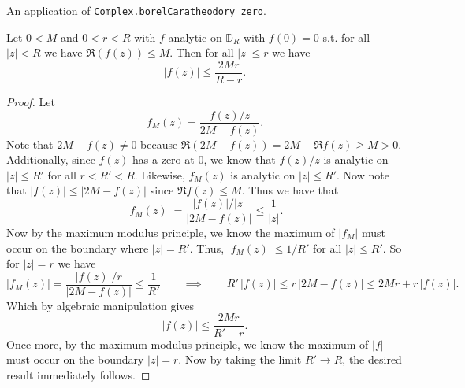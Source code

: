 \begin{theorem}[borelCaratheodory']
\label{borelCaratheodory'}
\leanok
An application of \texttt{Complex.borelCaratheodory\_zero}.

    Let $0<M$ and $0<r<R$ with $f$ analytic on $\mathbb{D}_R$ with $f(0)=0$ s.t. for all $|z|<R$
    we have $\mathfrak{R}(f(z))\leq M$. Then for all $|z|\leq r$ we have
    $$|f(z)|\leq\frac{2Mr}{R-r}.$$
\end{theorem}
\begin{proof}
\leanok
Let
    $$f_M(z)=\frac{f(z)/z}{2M-f(z)}.$$
    Note that $2M-f(z)\neq 0$ because
    $\Re (2M-f(z))=2M-\Re f(z)\geq M>0$. Additionally, since
    $f(z)$ has a zero at $0$, we know that $f(z)/z$ is analytic
    on $|z|\leq R'$ for all $r<R'<R$. Likewise, $f_M(z)$ is analytic on
    $|z|\leq R'$.
    Now note that $|f(z)|\leq|2M-f(z)|$ since $\Re f(z)\leq M$.
    Thus we have that
    $$|f_M(z)|=\frac{|f(z)|/|z|}{|2M-f(z)|}
      \leq\frac{1}{|z|}.$$
    Now by the maximum modulus principle, we know the maximum of
    $|f_M|$ must occur on the boundary where $|z|=R'$. Thus,
    $|f_M(z)|\leq 1/R'$ for all $|z|\leq R'$. So for $|z|=r$ we
    have
    $$|f_M(z)|=\frac{|f(z)|/r}{|2M-f(z)|}\leq\frac{1}{R'}
    \qquad\implies\qquad R'\,|f(z)|\leq r\,|2M-f(z)|\leq 2Mr+r\,|f(z)|.$$
    Which by algebraic manipulation gives
    $$|f(z)|\leq\frac{2Mr}{R'-r}.$$
    Once more, by the maximum modulus principle, we know the
    maximum of $|f|$ must occur on the boundary $|z|=r$.
    Now by taking the limit $R'\to R$, the desired result immediately follows.
\end{proof}
